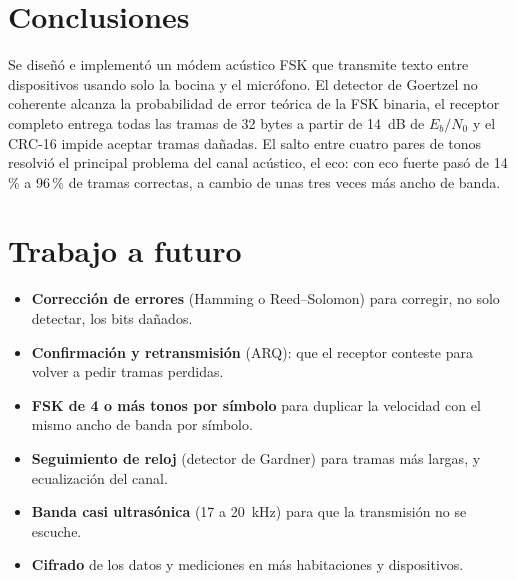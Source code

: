 \documentclass[10pt,twocolumn,letterpaper]{article}
\begin{document}
\section{Conclusiones}
Se diseñó e implementó un módem acústico FSK que transmite texto entre dispositivos usando solo la bocina y el micrófono. El detector de Goertzel no coherente alcanza la probabilidad de error teórica de la FSK binaria, el receptor completo entrega todas las tramas de 32 bytes a partir de 14~dB de $E_b/N_0$ y el CRC-16 impide aceptar tramas dañadas. El salto entre cuatro pares de tonos resolvió el principal problema del canal acústico, el eco: con eco fuerte pasó de 14\,\% a 96\,\% de tramas correctas, a cambio de unas tres veces más ancho de banda.

\section{Trabajo a futuro}
\begin{itemize}
\item \textbf{Corrección de errores} (Hamming o Reed--Solomon) para corregir, no solo detectar, los bits dañados.
\item \textbf{Confirmación y retransmisión} (ARQ): que el receptor conteste para volver a pedir tramas perdidas.
\item \textbf{FSK de 4 o más tonos por símbolo} para duplicar la velocidad con el mismo ancho de banda por símbolo.
\item \textbf{Seguimiento de reloj} (detector de Gardner) para tramas más largas, y ecualización del canal.
\item \textbf{Banda casi ultrasónica} (17 a 20~kHz) para que la transmisión no se escuche.
\item \textbf{Cifrado} de los datos y mediciones en más habitaciones y dispositivos.
\end{itemize}
\end{document}
